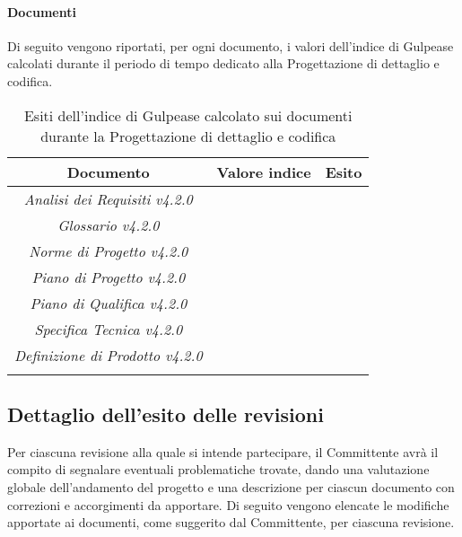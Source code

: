 \paragraph{Documenti}
Di seguito vengono riportati, per ogni documento, i valori dell'indice di Gulpease calcolati durante il periodo di tempo dedicato alla Progettazione di dettaglio e codifica.

\begin{longtable}{|c|p{3cm}|p{3cm}|}
\toprule
\textbf{Documento} & \textbf{Valore indice} & \textbf{Esito} \\


\midrule
\emph{Analisi dei Requisiti v4.2.0} &  &  \\
\midrule
\emph{Glossario v4.2.0} &  &  \\
\midrule
\emph{Norme di Progetto v4.2.0} &   & \\
\midrule
\emph{Piano di Progetto v4.2.0} &   & \\
\midrule
\emph{Piano di Qualifica v4.2.0} &   & \\
\midrule
\emph{Specifica Tecnica v4.2.0} &  & \\
\midrule
\emph{Definizione di Prodotto v4.2.0} &  & \\
\bottomrule
\caption{Esiti dell'indice di Gulpease calcolato sui documenti durante la Progettazione di dettaglio e codifica}
\label{tab:changelog}
\end{longtable}

\subsection{Dettaglio dell'esito delle revisioni}
Per ciascuna revisione alla quale si intende partecipare, il Committente avrà il compito di segnalare eventuali problematiche trovate, dando una valutazione globale dell'andamento del progetto e una descrizione per ciascun documento con correzioni e accorgimenti da apportare.
Di seguito vengono elencate le modifiche apportate ai documenti, come suggerito dal Committente, per ciascuna revisione.
